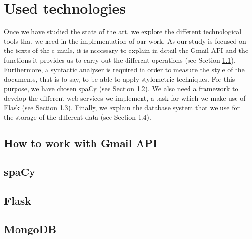 \chapter{Used technologies}
\label{cap:usedtech}


Once we have studied the state of the art, we explore the different technological tools that we need in the implementation of our work. As our study is focused on the texts of the e-mails, it is necessary to explain in detail the Gmail API and the functions it provides us to carry out the different operations (see Section \ref{sect:gmailapitech}). Furthermore, a syntactic analyser is required in order to measure the style of the documents, that is to say, to be able to apply stylometric techniques. For this purpose, we have chosen spaCy (see Section \ref{sect:spacy}). We also need a framework to develop the different web services we implement, a task for which we make use of Flask (see Section \ref{sect:flask}). Finally, we explain the database system that we use for the storage of the different data (see Section \ref{sect:mongo}).

\section{How to work with Gmail API}\label{sect:gmailapitech}


\section{spaCy}\label{sect:spacy}


\section{Flask}\label{sect:flask}


\section{MongoDB}\label{sect:mongo}
